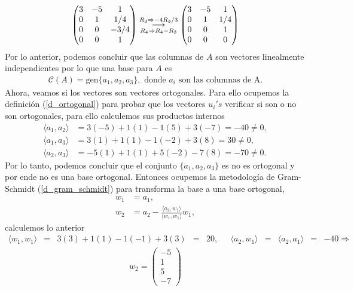 \documentclass[11pt,letterpaper]{article}
\newcommand{\mcC}{\mathcal{C}}
\newcommand{\grstep}[2][\relax]{%
   \ensuremath{\mathrel{
       {\mathop{\longrightarrow}\limits^{#2\mathstrut}_{
                                     \begin{subarray}{l} #1 \end{subarray}}}}}}
\newcommand{\gen}{\text{gen}}
\begin{document}
\begin{itemize}
\begin{align*}
%
\begin{pmatrix}
3 & -5 & 1 \\
0 & 1 & 1/4 \\
0 & 0 & -3/4 \\
0 & 0 & 1
\end{pmatrix}%
\grstep[R_4\Rightarrow R_4-R_3]{R_3 \Rightarrow -4R_3/3}
%
\begin{pmatrix}
3 & -5 & 1 \\
0 & 1 & 1/4 \\
0 & 0 & 1 \\
0 & 0 & 0
\end{pmatrix}
\end{align*}
Por lo anterior, podemos concluir que las columnas de $A$ son  vectores linealmente independientes por lo que una base para $A$ es
\begin{align*}
\mcC(A)=\gen\{a_1,a_2,a_3\}, \text{   donde } a_i \text{ son las columnas de A}.
\end{align*} 
Ahora, veamos si los vectores son vectores ortogonales. Para ello ocupemos la definición (\ref{d_ortogonal}) para probar que los vectores $u_i's$ verificar si son o no son ortogonales, para ello calculemos sus productos internos
\begin{align*}
\langle a_1, a_2 \rangle &= 3(-5) +1(1)-1(5)+3(-7)=-40\neq 0,\\
\langle a_1, a_3 \rangle &= 3(1) +1(1)-1(-2)+3(8)=30\neq 0, \\
\langle a_2, a_3 \rangle &= -5(1)+1(1)+5(-2)-7(8)=-70\neq 0.
\end{align*} 
Por lo tanto, podemos concluir que el conjunto $\{a_1, a_2,a_3\}$ es no es ortogonal y por ende no es una base ortogonal. Entonces ocupemos la metodología de Gram-Schmidt (\ref{d_gram_schmidt}) para transforma la base a una base ortogonal, 
\begin{align*}
w_1& = a_1,\\
w_2 &= a_2-\frac{\langle a_2, w_1 \rangle}{\langle w_1,w_1 \rangle}w_1,
\end{align*}
calculemos lo anterior 
\begin{align*}
\langle w_1, w_1 \rangle &=& 3(3)+1(1)-1(-1)+3(3)&=&20,\ \ \ & \langle a_2, w_1 \rangle &=& \langle a_2, a_1 \rangle &=&-40\Rightarrow
\end{align*}
\begin{align*}
w_2= \begin{pmatrix}
-5\\ 1\\5\\-7

\end{pmatrix}
\end{align*}
\end{itemize}
\end{document}
